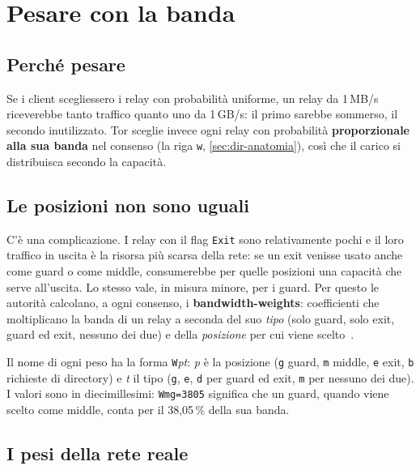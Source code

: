 \section{Pesare con la banda}\label{sec:percorso-pesi}

\subsection{Perché pesare}

Se i client scegliessero i relay con probabilità uniforme, un relay da 1\,MB/s riceverebbe tanto traffico quanto uno da 1\,GB/s: il primo sarebbe sommerso, il secondo inutilizzato. Tor sceglie invece ogni relay con probabilità \textbf{proporzionale alla sua banda} nel consenso (la riga \texttt{w}, \cref{sec:dir-anatomia}), così che il carico si distribuisca secondo la capacità.

\subsection{Le posizioni non sono uguali}

C'è una complicazione. I relay con il flag \texttt{Exit} sono relativamente pochi e il loro traffico in uscita è la risorsa più scarsa della rete: se un exit venisse usato anche come guard o come middle, consumerebbe per quelle posizioni una capacità che serve all'uscita. Lo stesso vale, in misura minore, per i guard. Per questo le autorità calcolano, a ogni consenso, i \textbf{bandwidth-weights}: coefficienti che moltiplicano la banda di un relay a seconda del suo \emph{tipo} (solo guard, solo exit, guard ed exit, nessuno dei due) e della \emph{posizione} per cui viene scelto~.

Il nome di ogni peso ha la forma \texttt{W}\emph{pt}: \emph{p} è la posizione (\texttt{g} guard, \texttt{m} middle, \texttt{e} exit, \texttt{b} richieste di directory) e \emph{t} il tipo (\texttt{g}, \texttt{e}, \texttt{d} per guard ed exit, \texttt{m} per nessuno dei due). I valori sono in diecimillesimi: \texttt{Wmg=3805} significa che un guard, quando viene scelto come middle, conta per il 38,05\,\% della sua banda.

\subsection{I pesi della rete reale}

